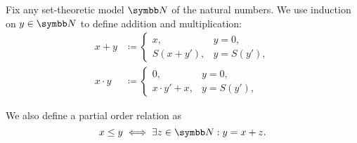 \begin{definition}\label{def:natural_number_operations}
  Fix any set-theoretic model \( \BN \) of the natural numbers. We use induction on \( y \in \BN \) to define addition and multiplication:
  \begin{align*}
    x + y &\coloneqq \begin{cases}
      x, &y = 0, \\
      S(x + y'), &y = S(y'),
    \end{cases}
    \\
    x \cdot y &\coloneqq \begin{cases}
      0, &y = 0, \\
      x \cdot y' + x, &y = S(y'),
    \end{cases}
  \end{align*}

  We also define a partial order relation as
  \begin{equation*}
    x \leq y \iff \exists z \in \BN: y = x + z.
  \end{equation*}
\end{definition}

